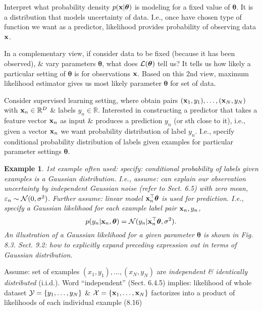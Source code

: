 \documentclass{article}
\newtheorem{example}{Example}
\begin{document}
\begin{itemize}
\begin{itemize}
\begin{itemize}
			Interpret what probability density $p({\bf x}|\boldsymbol{\theta})$ is modeling for a fixed value of $\boldsymbol{\theta}$. It is a distribution that models uncertainty of data. I.e., once have chosen type of function we want as a predictor, likelihood provides probability of observing data ${\bf x}$.
			
			In a complementary view, if consider data to be fixed (because it has been observed), \& vary parameters $\boldsymbol{\theta}$, what does ${\cal L}(\boldsymbol{\theta})$ tell us? It tells us how likely a particular setting of $\boldsymbol{\theta}$ is for observations ${\bf x}$. Based on this 2nd view, maximum likelihood estimator gives us most likely parameter $\boldsymbol{\theta}$ for set of data.
			
			Consider supervised learning setting, where obtain pairs $({\bf x}_1,y_1),\ldots,({\bf x}_N,y_N)$ with ${\bf x}_n\in\mathbb{R}^D$ \& labels $y_n\in\mathbb{R}$. Interested in constructing a predictor that takes a feature vector ${\bf x}_n$ as input \& produces a prediction $y_n$ (or sth close to it), i.e., given a vector ${\bf x}_n$ we want probability distribution of label $y_n$. I.e., specify conditional probability distribution of labels given examples for particular parameter settings $\boldsymbol{\theta}$.
			\begin{example}
				1st example often used: specify: conditional probability of labels given examples is a Gaussian distribution. I.e., assume: can explain our observation uncertainty by independent Gaussian noise (refer to Sect. 6.5) with zero mean, $\varepsilon_n\sim{\cal N}(0,\sigma^2)$. Further assume: linear model ${\bf x}_n^\top\boldsymbol{\theta}$ is used for prediction. I.e., specify a Gaussian likelihood for each example label pair ${\bf x}_n,y_n$,
				\begin{equation}
					p(y_n|{\bf x}_n,\boldsymbol{\theta}) = {\cal N}(y_n|{\bf x}_n^\top\boldsymbol{\theta},\sigma^2).
				\end{equation}
				An illustration of a Gaussian likelihood for a given parameter $\boldsymbol{\theta}$ is shown in {\sf Fig. 8.3}. Sect. 9.2: how to explicitly expand preceding expression out in terms of Gaussian distribution.
			\end{example}
			Assume: set of examples $(x_1,y_1),\ldots,(x_N,y_N)$ are {\it independent \& identically distributed} (i.i.d.). Word ``independent'' (Sect. 6.4.5) implies: likelihood of whole dataset ${\cal Y} = \{y_1,\ldots,y_N\}$ \& ${\cal X} = \{{\bf x}_1,\ldots,{\bf x}_N\}$ factorizes into a product of likelihoods of each individual example (8.16)

\end{itemize}
\end{itemize}
\end{itemize}
\end{document}

